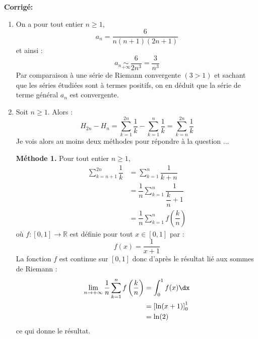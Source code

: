 \documentclass[a4paper,twoside,french,10pt]{VcCours}
\newcommand{\corr}{\textbf{Corrigé:}}
\begin{document}
\corr 
\begin{enumerate}
\item On a pour tout entier $n \geq 1$,
$$ a_n = \dfrac{6}{n(n+1)(2n+1)}$$
et ainsi :
$$ a_n \underset{+ \infty}{\sim} \dfrac{6}{2n^3}= \dfrac{3}{n^3}$$
Par comparaison à une série de Riemann convergente $(3>1)$ et sachant que les séries étudiées sont à termes positifs, on en déduit que la série de terme général $a_n$ est convergente.
\item Soit $n \geq 1$. Alors :
$$ H_{2n}-H_n = \sum_{k=1}^{2n} \dfrac{1}{k} - \sum_{k=1}^{n} \dfrac{1}{k} = \sum_{k=n}^{2n} \dfrac{1}{k}$$
Je vois alors au moins deux méthodes pour répondre à la question ...

\medskip

\noindent \textbf{Méthode 1.} Pour tout entier $n \geq 1$,
\begin{align*}
\sum_{k=n+1}^{2n} \dfrac{1}{k} & = \sum_{k=1}^{n} \dfrac{1}{k+n} \\
& = \dfrac{1}{n} \sum_{k=1}^{n} \dfrac{1}{\dfrac{k}{n} +1} \\
& =  \dfrac{1}{n} \sum_{k=1}^n f \left( \dfrac{k}{n} \right)
\end{align*}
où $f : [0,1] \rightarrow \mathbb{R}$ est définie pour tout $x \in [0,1]$ par :
$$ f(x) = \dfrac{1}{x+1}$$
La fonction $f$ est continue sur $[0,1]$ donc d'après le résultat lié aux sommes de Riemann :
\begin{align*}
\lim_{n \rightarrow + \infty} \dfrac{1}{n} \sum_{k=1}^n f \left( \dfrac{k}{n} \right) & = \int_{0}^1 f(x) \dx \\
& = \left[\ln(x+1) \right]_0^1 \\
& = \ln(2) \\
\end{align*}
ce qui donne le résultat.

\medskip


\end{enumerate}
\end{document}
